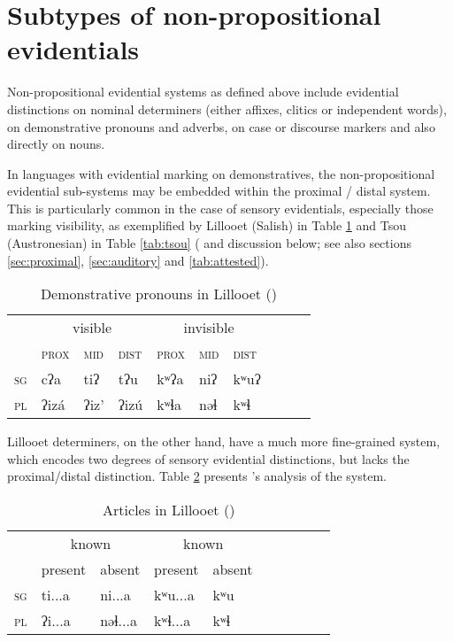 \documentclass[oneside,a4paper,11pt]{article}
\newcommand{\ipa}[1]{{\phon \mbox{#1}}} %
\begin{document}
\section{Subtypes of non-propositional evidentials} \label{sec:subtypes}
Non-propositional evidential systems as defined above include evidential distinctions on nominal determiners (either affixes, clitics or independent words),  on demonstrative pronouns and adverbs, on case or discourse markers and also directly on nouns.

In languages with evidential marking on demonstratives, the  non-propositional evidential sub-systems may be embedded within the proximal / distal system.  This is particularly common in the case of sensory evidentials, especially those marking visibility, as exemplified by Lillooet (Salish) in Table \ref{tab:statimcets.pro} and Tsou (Austronesian) in Table \ref{tab:tsou} (\citealt{tung64tsou, yang00tsou.case} and discussion below; see also sections \ref{sec:proximal}, \ref{sec:auditory} and \ref{tab:attested}). 

\begin{table}[H]
\caption{Demonstrative pronouns in Lillooet (\citealt[168-9]{eijk97lillooet})} \label{tab:statimcets.pro} \centering 
\begin{tabular}{l|lll|llllll}
\toprule
& \multicolumn{3}{c}{visible} & \multicolumn{3}{c}{invisible} \\
&\textsc{prox} & \textsc{mid} & \textsc{dist}&\textsc{prox} & \textsc{mid} & \textsc{dist} \\
\midrule
\textsc{sg} & \ipa{cʔa} & \ipa{tiʔ} & \ipa{tʔu} & \ipa{kʷʔa} & \ipa{niʔ} & \ipa{kʷuʔ}  \\
\textsc{pl} & \ipa{ʔizá} & \ipa{ʔiz'} & \ipa{ʔizú} & \ipa{kʷɬa} & \ipa{nəɬ} & \ipa{kʷɬ} \\
\bottomrule
\end{tabular}
\end{table}

Lillooet determiners, on the other hand, have a much more fine-grained system, which encodes two degrees of sensory  evidential distinctions, but lacks the proximal/distal distinction. Table \ref{tab:statimcets.det}  presents \citet{eijk97lillooet}'s analysis of the system. 

 \begin{table}[H]
\caption{Articles in Lillooet (\citealt[192]{eijk97lillooet})} \label{tab:statimcets.det} \centering 
\begin{tabular}{l|lllllllll}
\toprule
& \multicolumn{2}{c}{known} &\multicolumn{2}{c}{known} \\
& present & absent & present & absent \\
\midrule
\textsc{sg} & \ipa{ti...a} & \ipa{ni...a} & \ipa{kʷu...a} &\ipa{kʷu} \\
\textsc{pl} &  \ipa{ʔi...a} & \ipa{nəɬ...a} & \ipa{kʷɬ...a} &\ipa{kʷɬ} \\
\bottomrule
\end{tabular}
\end{table}
 
\end{document}
